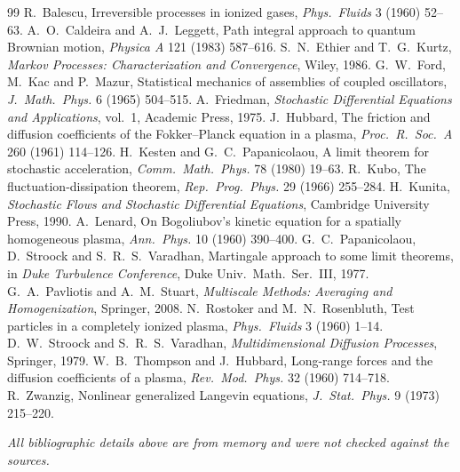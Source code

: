 \documentclass[11pt]{article}
\theoremstyle{remark}
\begin{document}
\begin{thebibliography}{99}
\small
{} R.~Balescu, Irreversible processes in ionized gases,
  \emph{Phys.\ Fluids} 3 (1960) 52--63.
 A.~O.~Caldeira and A.~J.~Leggett, Path integral approach to
  quantum Brownian motion, \emph{Physica A} 121 (1983) 587--616.
 S.~N.~Ethier and T.~G.~Kurtz, \emph{Markov Processes:
  Characterization and Convergence}, Wiley, 1986.
 G.~W.~Ford, M.~Kac and P.~Mazur, Statistical mechanics of
  assemblies of coupled oscillators, \emph{J.\ Math.\ Phys.} 6 (1965)
  504--515.
 A.~Friedman, \emph{Stochastic Differential Equations and
  Applications}, vol.~1, Academic Press, 1975.
 J.~Hubbard, The friction and diffusion coefficients of the
  Fokker--Planck equation in a plasma, \emph{Proc.\ R.\ Soc.\ A} 260 (1961)
  114--126.
 H.~Kesten and G.~C.~Papanicolaou, A limit theorem for
  stochastic acceleration, \emph{Comm.\ Math.\ Phys.} 78 (1980) 19--63.
 R.~Kubo, The fluctuation-dissipation theorem, \emph{Rep.\
  Prog.\ Phys.} 29 (1966) 255--284.
 H.~Kunita, \emph{Stochastic Flows and Stochastic
  Differential Equations}, Cambridge University Press, 1990.
 A.~Lenard, On Bogoliubov's kinetic equation for a spatially
  homogeneous plasma, \emph{Ann.\ Phys.} 10 (1960) 390--400.
 G.~C.~Papanicolaou, D.~Stroock and S.~R.~S.~Varadhan,
  Martingale approach to some limit theorems, in \emph{Duke Turbulence
  Conference}, Duke Univ.\ Math.\ Ser.\ III, 1977.
 G.~A.~Pavliotis and A.~M.~Stuart, \emph{Multiscale
  Methods: Averaging and Homogenization}, Springer, 2008.
 N.~Rostoker and M.~N.~Rosenbluth, Test particles in a
  completely ionized plasma, \emph{Phys.\ Fluids} 3 (1960) 1--14.
\bibitem{SV} D.~W.~Stroock and S.~R.~S.~Varadhan, \emph{Multidimensional
  Diffusion Processes}, Springer, 1979.
 W.~B.~Thompson and J.~Hubbard, Long-range forces and the
  diffusion coefficients of a plasma, \emph{Rev.\ Mod.\ Phys.} 32 (1960)
  714--718.
 R.~Zwanzig, Nonlinear generalized Langevin equations,
  \emph{J.\ Stat.\ Phys.} 9 (1973) 215--220.
\end{thebibliography}
\noindent\emph{All bibliographic details above are from memory and were not
checked against the sources.}
\end{document}
